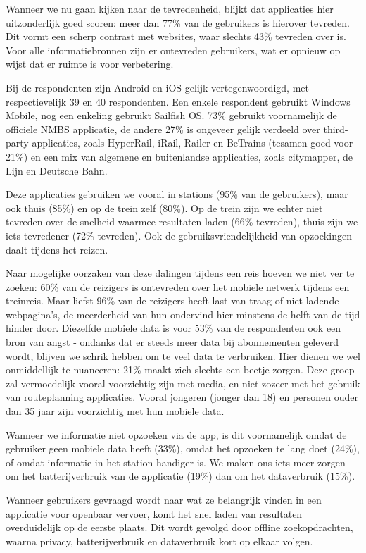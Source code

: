 Wanneer we nu gaan kijken naar de tevredenheid, blijkt dat applicaties hier uitzonderlijk goed scoren: meer dan 77\% van de gebruikers is hierover tevreden. Dit vormt een scherp contrast met websites, waar slechts 43\% tevreden over is. Voor alle informatiebronnen zijn er ontevreden gebruikers, wat er opnieuw op wijst dat er ruimte is voor verbetering.

Bij de respondenten zijn Android en iOS gelijk vertegenwoordigd, met respectievelijk 39 en 40 respondenten. Een enkele respondent gebruikt Windows Mobile, nog een enkeling gebruikt Sailfish OS. 73\% gebruikt voornamelijk de officiele NMBS applicatie, de andere 27\% is ongeveer gelijk verdeeld over third-party applicaties, zoals HyperRail, iRail, Railer en BeTrains (tesamen goed voor 21\%) en een mix van algemene en buitenlandse applicaties, zoals citymapper, de Lijn en Deutsche Bahn.

Deze applicaties gebruiken we vooral in stations (95\% van de gebruikers), maar ook thuis (85\%) en op de trein zelf (80\%). Op de trein zijn we echter niet tevreden over de snelheid waarmee resultaten laden (66\% tevreden), thuis zijn we iets tevredener (72\% tevreden). Ook de gebruiksvriendelijkheid van opzoekingen daalt tijdens het reizen. 

Naar mogelijke oorzaken van deze dalingen tijdens een reis hoeven we niet ver te zoeken: 60\% van de reizigers is ontevreden over het mobiele netwerk tijdens een treinreis. Maar liefst 96\% van de reizigers heeft last van traag of niet ladende webpagina's, de meerderheid van hun ondervind hier minstens de helft van de tijd hinder door. Diezelfde mobiele data is voor 53\% van de respondenten ook een bron van angst - ondanks dat er steeds meer data bij abonnementen geleverd wordt, blijven we schrik hebben om te veel data te verbruiken. Hier dienen we wel onmiddellijk te nuanceren: 21\% maakt zich slechts een beetje zorgen. Deze groep zal vermoedelijk vooral voorzichtig zijn met media, en niet zozeer met het gebruik van routeplanning applicaties. Vooral jongeren (jonger dan 18) en personen ouder dan 35 jaar zijn voorzichtig met hun mobiele data.

Wanneer we informatie niet opzoeken via de app, is dit voornamelijk omdat de gebruiker geen mobiele data heeft (33\%), omdat het opzoeken te lang doet (24\%), of omdat informatie in het station handiger is. We maken ons iets meer zorgen om het batterijverbruik van de applicatie (19\%) dan om het dataverbruik (15\%).

Wanneer gebruikers gevraagd wordt naar wat ze belangrijk vinden in een applicatie voor openbaar vervoer, komt het snel laden van resultaten overduidelijk op de eerste plaats. Dit wordt gevolgd door offline zoekopdrachten, waarna privacy, batterijverbruik en dataverbruik kort op elkaar volgen.

